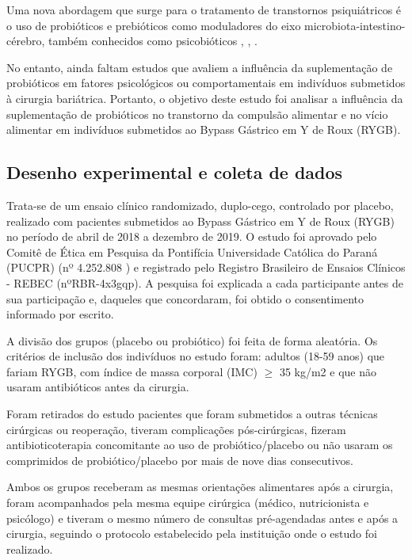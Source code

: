 Uma nova abordagem que surge para o tratamento de transtornos psiquiátricos é o uso de probióticos e prebióticos como moduladores do eixo microbiota-intestino-cérebro, também conhecidos como psicobióticos \citep{dinan2013psychobiotics}, \citep{mason2017feeding}, \citep{misra2019psychobiotics}.

No entanto, ainda faltam estudos que avaliem a influência da suplementação de probióticos em fatores psicológicos ou comportamentais em indivíduos submetidos à cirurgia bariátrica. Portanto, o objetivo deste estudo foi analisar a influência da suplementação de probióticos no transtorno da compulsão alimentar e no vício alimentar em indivíduos submetidos ao Bypass Gástrico em Y de Roux (RYGB).


\subsection{Desenho experimental e coleta de dados}

Trata-se de um ensaio clínico randomizado, duplo-cego, controlado por placebo, realizado com pacientes submetidos ao Bypass Gástrico em Y de Roux (RYGB) no período de abril de 2018 a dezembro de 2019. O estudo foi aprovado pelo Comitê de Ética em Pesquisa da Pontifícia Universidade Católica do Paraná (PUCPR) (nº 4.252.808 ) e registrado pelo Registro Brasileiro de Ensaios Clínicos - REBEC (nºRBR-4x3gqp). A pesquisa foi explicada a cada participante antes de sua participação e, daqueles que concordaram, foi obtido o consentimento informado por escrito.

A divisão dos grupos (placebo ou probiótico) foi feita de forma aleatória. Os critérios de inclusão dos indivíduos no estudo foram: adultos (18-59 anos) que fariam RYGB, com índice de massa corporal (IMC) $\geq$ 35 kg/m2 e que não usaram antibióticos antes da cirurgia. 

Foram retirados do estudo pacientes que foram submetidos a outras técnicas cirúrgicas ou reoperação, tiveram complicações pós-cirúrgicas, fizeram antibioticoterapia concomitante ao uso de probiótico/placebo ou não usaram os comprimidos de probiótico/placebo por mais de nove dias consecutivos. 

Ambos os grupos receberam as mesmas orientações alimentares após a cirurgia, foram acompanhados pela mesma equipe cirúrgica (médico, nutricionista e psicólogo) e tiveram o mesmo número de consultas pré-agendadas antes e após a cirurgia, seguindo o protocolo estabelecido pela instituição onde o estudo foi realizado.

